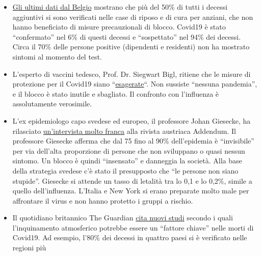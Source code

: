 \begin{itemize}
{  metà aprile} che in Lombardia oltre 1.800 persone sono morte nelle
  case di cura per anziani e in molti casi la causa della morte non è
  stata ancora chiarita. In precedenza, era già noto che l'assistenza
  agli anziani e l'assistenza infermieristica e, di conseguenza, tutte
  le cure sanitarie, erano collassate in alcune zone della Lombardia, in
  parte a causa della paura del virus e del blocco.
\item
  \href{https://covid-19.sciensano.be/sites/default/files/Covid19/Meest\%20recente\%20update.pdf}{Gli
  ultimi dati dal Belgio} mostrano che più del 50\% di tutti i decessi
  aggiuntivi si sono verificati nelle case di riposo e di cura per
  anziani, che non hanno beneficiato di misure precauzionali di blocco.
  Covid19 è stato ``confermato'' nel 6\% di questi decessi e
  ``sospettato'' nel 94\% dei decessi. Circa il 70\% delle persone
  positive (dipendenti e residenti) non ha mostrato sintomi al momento
  del test.
\item
  L'esperto di vaccini tedesco, Prof. Dr. Siegwart Bigl, ritiene che le
  misure di protezione per il Covid19 siano
  ``\href{https://www.pressreader.com/germany/dresdner-neueste-nachrichten/20200423/281496458428447}{esagerate}``.
  Non sussiste ``nessuna pandemia'', e il blocco è stato inutile e
  sbagliato. Il confronto con l'influenza è assolutamente verosimile.
\item
  L'ex epidemiologo capo svedese ed europeo, il professore Johan
  Giesecke, ha rilasciato
  \href{https://www.addendum.org/coronavirus/interview-johan-giesecke/}{un'intervista
  molto franca} alla rivista austriaca Addendum. Il professore Giesecke
  afferma che dal 75 fino al 90\% dell'epidemia è ``invisibile'' per via
  dell'alta proporzione di persone che non sviluppano o quasi nessun
  sintomo. Un blocco è quindi ``insensato'' e danneggia la società. Alla
  base della strategia svedese c'è stato il presupposto che ``le persone
  non siano stupide''. Giesecke si attende un tasso di letalità tra lo
  0,1 e lo 0,2\%, simile a quello dell'influenza. L'Italia e New York si
  erano preparate molto male per affrontare il virus e non hanno
  protetto i gruppi a rischio.
\item
  Il quotidiano britannico The Guardian
  \href{https://www.theguardian.com/environment/2020/apr/20/air-pollution-may-be-key-contributor-to-covid-19-deaths-study?utm_medium}{cita
  nuovi studi} secondo i quali l'inquinamento atmosferico potrebbe
  essere un ``fattore chiave'' nelle morti di Covid19. Ad esempio,
  l'80\% dei decessi in quattro paesi si è verificato nelle regioni più

\end{itemize}
